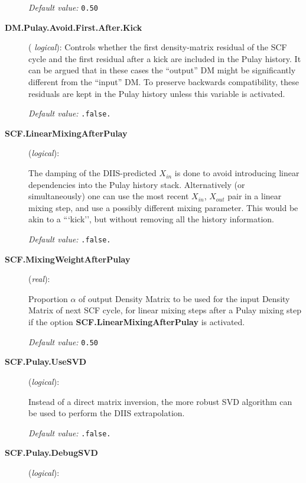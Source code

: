 \documentclass[11pt]{article}
\begin{document}
\begin{description}
{\it Default value:} {\tt 0.50}

\item[{\bf DM.Pulay.Avoid.First.After.Kick}] ({\it
  logical}):
   Controls
  whether the first density-matrix residual of the SCF cycle and the
  first residual after a kick are included in the Pulay history. It
  can be argued that in these cases the ``output'' DM might be
  significantly different from the ``input'' DM. To preserve backwards
  compatibility, these residuals are kept in the Pulay history unless
  this variable is activated.

{\it Default value:} {\tt .false.}


\item[{\bf SCF.LinearMixingAfterPulay}] ({\it logical}):

The damping of the DIIS-predicted $X_{in}$ is done to avoid introducing
linear dependencies into the Pulay history stack. Alternatively (or
simultaneously) one can use the most recent $X_{in}$, $X_{out}$ pair in a
linear mixing step, and use a possibly different mixing
parameter. This would be akin to a ```kick'', but without removing all
the history information.

{\it Default value:} {\tt .false.}

\item[{\bf SCF.MixingWeightAfterPulay}] ({\it real}):

Proportion $\alpha$ of output Density Matrix to be used for the input
Density Matrix of next SCF cycle, for linear mixing
steps after a Pulay mixing step if the option {\bf
  SCF.LinearMixingAfterPulay} is activated.

{\it Default value:} {\tt 0.50}

\item[{\bf SCF.Pulay.UseSVD}] ({\it logical}):

Instead of a direct matrix inversion, the more robust SVD algorithm can
be used to perform the DIIS extrapolation.

{\it Default value:} {\tt .false.}

\item[{\bf SCF.Pulay.DebugSVD}] ({\it logical}):


\end{description}
\end{document}
